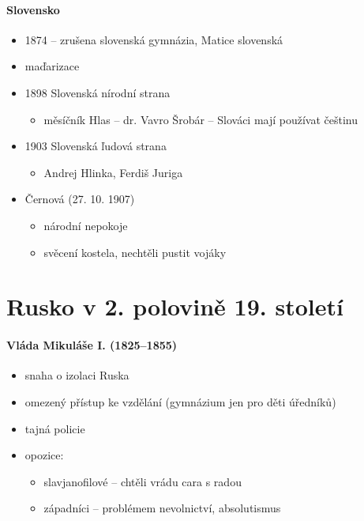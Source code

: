 \begin{itemize}
\paragraph{Slovensko}
\begin{itemize}
\item 1874 -- zrušena slovenská gymnázia, Matice slovenská
\item maďarizace
\item 1898 Slovenská nírodní strana
	\begin{itemize}
	\item měsíčník Hlas -- dr. Vavro Šrobár -- Slováci mají používat češtinu 
	\end{itemize}
\item  1903 Slovenská ľudová strana
	\begin{itemize}
	\item Andrej Hlinka, Ferdiš Juriga
	\end{itemize}
\item Černová (27. 10. 1907)
	\begin{itemize}
	\item národní nepokoje
	\item svěcení kostela, nechtěli pustit vojáky
	\end{itemize}
\end{itemize}
\end{itemize}




\section{Rusko v 2. polovině 19. století}
\paragraph{Vláda Mikuláše I. (1825--1855)}
\begin{itemize}
\item snaha o izolaci Ruska
\item omezený přístup ke vzdělání (gymnázium jen pro děti úředníků)
\item tajná policie
\item opozice:
	\begin{itemize}
	\item slavjanofilové -- chtěli vrádu cara s radou
	\item západníci -- problémem nevolnictví, absolutismus
	\end{itemize}
\end{itemize}

